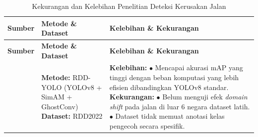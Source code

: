 \small
\renewcommand{\arraystretch}{1.3}
\begin{longtable}{>{\raggedright}p{1.4cm}>{\raggedright}p{3.3cm}>{\raggedright\arraybackslash}p{7.8cm}}
  \caption{Kekurangan dan Kelebihan Penelitian Deteksi Kerusakan Jalan}\label{tab:penelitian_terkait}                                                                                                                                                                                                                                                                                                                                                                                                                             \\
  \hline
  \textbf{Sumber}             & \textbf{Metode \& Dataset}                                                                                                  & \textbf{Kelebihan \& Kekurangan}                                                                                                                                                                                                                                                                                                                                    \\
  \hline
  \endfirsthead
  \hline
  \textbf{Sumber}             & \textbf{Metode \& Dataset}                                                                                                  & \textbf{Kelebihan \& Kekurangan}                                                                                                                                                                                                                                                                                                                                    \\
  \hline
  \endhead
  \hline
  \endfoot
  \cite{Li2024}               & \textbf{Metode:} RDD-YOLO (YOLOv8 + SimAM + GhostConv) \newline \textbf{Dataset:} RDD2022                                   & \textbf{Kelebihan:} \newline $\bullet$ Mencapai akurasi mAP yang tinggi dengan beban komputasi yang lebih efisien dibandingkan YOLOv8 standar. \newline \textbf{Kekurangan:} \newline $\bullet$ Belum menguji efek \textit{domain shift} pada jalan di luar 6 negara dataset latih. \newline $\bullet$ Dataset tidak memuat anotasi kelas pengecoh secara spesifik. \\

\end{longtable}
